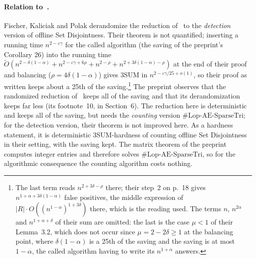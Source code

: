 \documentclass[11pt]{article}
\theoremstyle{definition}
\theoremstyle{remark}
\newcommand{\Lop}{\mathrm{Lop}\text{-}\allowbreak\mathrm{AE}\text{-}\allowbreak\mathrm{SparseTri}}
\begin{document}
\paragraph{Relation to~\cite[Theorem~1.4]{FKP24}.} Fischer, Kaliciak and Polak derandomize the reduction of~\cite{KPP16} to the \emph{detection} version of offline Set Disjointness. Their theorem is not quantified; inserting a running time $n^{2-\varepsilon\gamma}$ for the called algorithm (the saving of the preprint's Corollary 26) into the running time $\tilde O(n^{2-\delta(1-\alpha)}+n^{2-\varepsilon\gamma+6\rho}+n^{2-\rho}+n^{2+3\delta(1-\alpha)-\rho})$ at the end of their proof \cite[p.~19]{FKP24} and balancing ($\rho=4\delta(1-\alpha)$) gives 3SUM in $n^{2-\varepsilon\gamma/25+o(1)}$, so their proof as written keeps about a 25th of the saving.\footnote{The last term reads $n^{2+3\delta-\rho}$ there; their step~2 on p.~18 gives $n^{1+\alpha+3\delta(1-\alpha)}$ false positives, the middle expression of $|R|\cdot O((n^{1-\alpha})^{1+3\delta})$ there, which is the reading used. The terms $n$, $n^{2\alpha}$ and $n^{1+\alpha+\delta}$ of their sum are omitted: the last is the case $\mu<1$ of their Lemma~3.2, which does not occur since $\mu=2-2\delta\ge1$ at the balancing point, where $\delta(1-\alpha)$ is a 25th of the saving and the saving is at most $1-\alpha$, the called algorithm having to write its $n^{1+\alpha}$ answers.} The preprint observes that the randomized reduction of~\cite{KPP16} keeps all of the saving and that its derandomization~\cite{FKP24} keeps far less (its footnote~10, in Section~6). The reduction here is deterministic and keeps all of the saving, but needs the \emph{counting} version $\#\Lop$; for the detection version, their theorem is not improved here. As a hardness statement, it is deterministic 3SUM-hardness of counting offline Set Disjointness in their setting, with the saving kept. The matrix theorem of the preprint computes integer entries and therefore solves $\#\Lop$, so for the algorithmic consequence the counting algorithm costs nothing.
\end{document}
